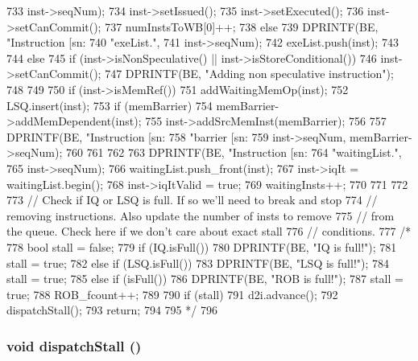 \begin{DoxyCode}
{{{{733                         inst->seqNum);
734                 inst->setIssued();
735                 inst->setExecuted();
736                 inst->setCanCommit();
737                 numInstsToWB[0]++;
738             } else {
739                 DPRINTF(BE, "Instruction [sn:%
740                         "exeList.\n",
741                         inst->seqNum);
742                 exeList.push(inst);
743             }
744         } else {
745             if (inst->isNonSpeculative() || inst->isStoreConditional()) {
746                 inst->setCanCommit();
747                 DPRINTF(BE, "Adding non speculative instruction\n");
748             }
749 
750             if (inst->isMemRef()) {
751                 addWaitingMemOp(inst);
752                 LSQ.insert(inst);
753                 if (memBarrier) {
754                     memBarrier->addMemDependent(inst);
755                     inst->addSrcMemInst(memBarrier);
756 
757                     DPRINTF(BE, "Instruction [sn:%
758                             "barrier [sn:%
759                             inst->seqNum, memBarrier->seqNum);
760                 }
761             }
762 
763             DPRINTF(BE, "Instruction [sn:%
764                     "waitingList.\n",
765                     inst->seqNum);
766             waitingList.push_front(inst);
767             inst->iqIt = waitingList.begin();
768             inst->iqItValid = true;
769             waitingInsts++;
770         }
771     }
772 
773     // Check if IQ or LSQ is full.  If so we'll need to break and stop
774     // removing instructions.  Also update the number of insts to remove
775     // from the queue.  Check here if we don't care about exact stall
776     // conditions.
777 /*
778     bool stall = false;
779     if (IQ.isFull()) {
780         DPRINTF(BE, "IQ is full!\n");
781         stall = true;
782     } else if (LSQ.isFull()) {
783         DPRINTF(BE, "LSQ is full!\n");
784         stall = true;
785     } else if (isFull()) {
786         DPRINTF(BE, "ROB is full!\n");
787         stall = true;
788         ROB_fcount++;
789     }
790     if (stall) {
791         d2i.advance();
792         dispatchStall();
793         return;
794     }
795 */
796 }
\end{DoxyCode}
\hypertarget{classLWBackEnd_a3a69629e2b050560eb983bdedffc30ba}{
\subsubsection[{dispatchStall}]{\setlength{\rightskip}{0pt plus 5cm}void dispatchStall ()}}
\label{classLWBackEnd_a3a69629e2b050560eb983bdedffc30ba}



